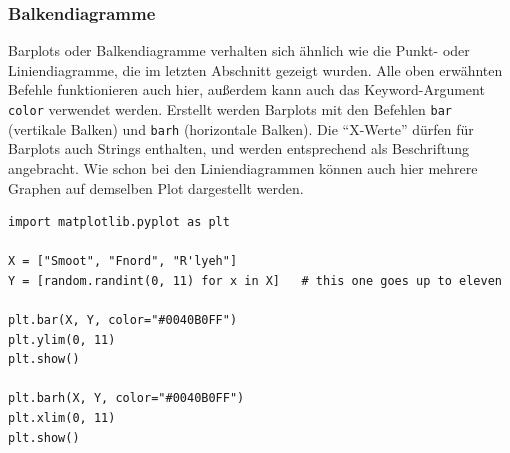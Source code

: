 \subsubsection{Balkendiagramme}
Barplots oder Balkendiagramme verhalten sich ähnlich wie die Punkt- oder Liniendiagramme, die im letzten Abschnitt gezeigt wurden. Alle oben erwähnten Befehle funktionieren auch hier, außerdem kann auch das Keyword-Argument \texttt{color} verwendet werden. Erstellt werden Barplots mit den Befehlen \texttt{bar} (vertikale Balken) und \texttt{barh} (horizontale Balken). Die \enquote{X-Werte} dürfen für Barplots auch Strings enthalten, und werden entsprechend als Beschriftung angebracht. Wie schon bei den Liniendiagrammen können auch hier mehrere Graphen auf demselben Plot dargestellt werden.

\begin{codebox}
\begin{verbatim}
import matplotlib.pyplot as plt

X = ["Smoot", "Fnord", "R'lyeh"]
Y = [random.randint(0, 11) for x in X]   # this one goes up to eleven

plt.bar(X, Y, color="#0040B0FF")
plt.ylim(0, 11)
plt.show()

plt.barh(X, Y, color="#0040B0FF")
plt.xlim(0, 11)
plt.show()
\end{verbatim}
\end{codebox}
%
